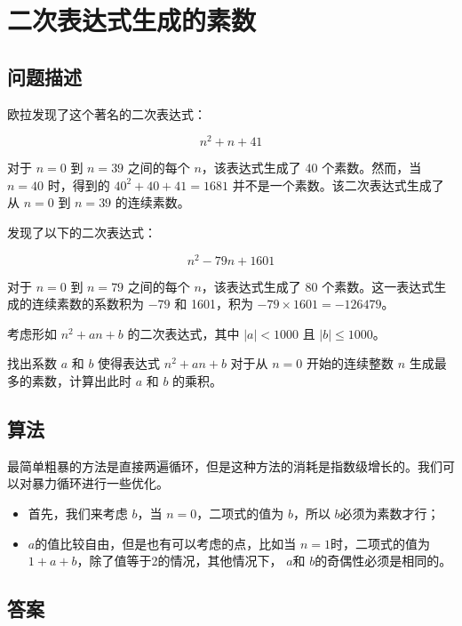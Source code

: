 \section{二次表达式生成的素数}
\subsection{问题描述}
\begin{tcolorbox}
欧拉发现了这个著名的二次表达式：

\[
n^2 + n + 41
\]

对于 \( n = 0 \) 到 \( n = 39 \) 之间的每个 \( n \)，该表达式生成了 40 个素数。然而，当 \( n = 40 \) 时，得到的 \( 40^2 + 40 + 41 = 1681 \) 并不是一个素数。该二次表达式生成了从 \( n = 0 \) 到 \( n = 39 \) 的连续素数。

发现了以下的二次表达式：

\[
n^2 - 79n + 1601
\]

对于 \( n = 0 \) 到 \( n = 79 \) 之间的每个 \( n \)，该表达式生成了 80 个素数。这一表达式生成的连续素数的系数积为 \( -79 \) 和 1601，积为 \( -79 \times 1601 = -126479 \)。

考虑形如 \( n^2 + an + b \) 的二次表达式，其中 \( |a| < 1000 \) 且 \( |b| \leq 1000 \)。

找出系数 \( a \) 和 \( b \) 使得表达式 \( n^2 + an + b \) 对于从 \( n = 0 \) 开始的连续整数 \( n \) 生成最多的素数，计算出此时 \( a \) 和 \( b \) 的乘积。

\end{tcolorbox}

\subsection{算法}
最简单粗暴的方法是直接两遍循环，但是这种方法的消耗是指数级增长的。我们可以对暴力循环进行一些优化。

\begin{itemize}
  \item 首先，我们来考虑 \( b \)，当 \( n = 0 \)，二项式的值为 \( b \)，所以 \( b \)必须为素数才行；
  \item \( a \)的值比较自由，但是也有可以考虑的点，比如当 \( n = 1 \)时，二项式的值为 \( 1 + a + b
    \)，除了值等于2的情况，其他情况下， \( a \)和 \( b \)的奇偶性必须是相同的。
\end{itemize}

\subsection{答案}
